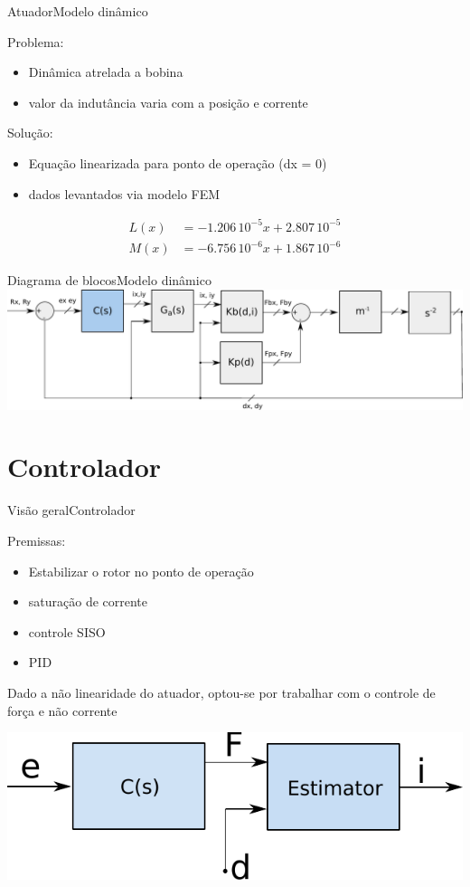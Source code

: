 \documentclass{beamer}
\begin{document}
\begin{frame}{Atuador}{Modelo dinâmico}

Problema:
	\begin{itemize}
		\item Dinâmica atrelada a bobina
		\item valor da indutância varia com a posição e corrente
	\end{itemize}
	
Solução:
	
	\begin{itemize}
	\item Equação linearizada para ponto de operação (dx = 0) 
	\item dados levantados via modelo FEM
	\end{itemize}

	
	\begin{align*}
		L(x) &= -1.206 \,10^{-5} x + 2.807 \, 10^{-5} \\
		M(x) &= -6.756 \,10^{-6} x + 1.867 \, 10^{-6} 
	\end{align*} 
	
\end{frame}

\begin{frame}{Diagrama de blocos}{Modelo dinâmico}
\includegraphics[width=1\linewidth]{Modelagem/diagrama_blocos_modelo_linear}
\end{frame}

\section{Controlador}

\begin{frame}{Visão geral}{Controlador}

Premissas:

\begin{itemize}
\item Estabilizar o rotor no ponto de operação
\item saturação de corrente
\item controle SISO
\item PID
\end{itemize}

Dado a não linearidade do atuador, optou-se por trabalhar com o controle de força e não corrente

\vspace{10px}
\centering
\includegraphics[width=0.5\linewidth]{Modelagem/controlador_estimador}

\end{frame}
\end{document}
